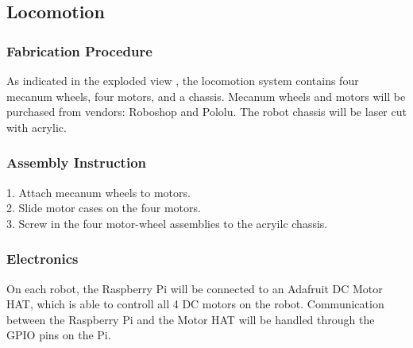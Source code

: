 
\subsection{Locomotion}
\label{sec:hardware_locomotion}

\subsubsection{Fabrication Procedure}
\label{sec:locomotion_fab}
As indicated in the exploded view , the locomotion system contains four mecanum wheels, four motors, and a chassis. Mecanum wheels and motors will be purchased from vendors: Roboshop and Pololu. The robot chassis will be laser cut with acrylic.

\subsubsection{Assembly Instruction}
\label{sec:locomotion_assemb}
1. Attach mecanum wheels to motors.\\
2. Slide motor cases on the four motors. \\
3. Screw in the four motor-wheel assemblies to the acryilc chassis.

\subsubsection{Electronics}
\label{sec:locomotion_electronics}
On each robot, the Raspberry Pi will be connected to an Adafruit DC Motor HAT, which is able to controll all 4 DC motors on the robot. Communication between the Raspberry Pi and the Motor HAT will be handled through the GPIO pins on the Pi. 